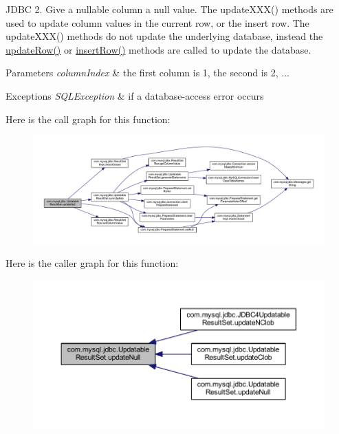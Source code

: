 J\+D\+BC 2. Give a nullable column a null value. The update\+X\+X\+X() methods are used to update column values in the current row, or the insert row. The update\+X\+X\+X() methods do not update the underlying database, instead the \mbox{\hyperlink{classcom_1_1mysql_1_1jdbc_1_1_updatable_result_set_a919969ba4b3c7cbc7b18605e9f31a746}{update\+Row()}} or \mbox{\hyperlink{classcom_1_1mysql_1_1jdbc_1_1_updatable_result_set_aef041f8d9d0778083716fc26652648fa}{insert\+Row()}} methods are called to update the database.


\begin{DoxyParams}{Parameters}
{\em column\+Index} & the first column is 1, the second is 2, ...\\
\hline
\end{DoxyParams}

\begin{DoxyExceptions}{Exceptions}
{\em S\+Q\+L\+Exception} & if a database-\/access error occurs \\
\hline
\end{DoxyExceptions}
Here is the call graph for this function\+:
\nopagebreak
\begin{figure}[H]
\begin{center}
\leavevmode
\includegraphics[width=350pt]{classcom_1_1mysql_1_1jdbc_1_1_updatable_result_set_a37fe836a746ef0fbbf56ca12092abedf_cgraph}
\end{center}
\end{figure}
Here is the caller graph for this function\+:
\nopagebreak
\begin{figure}[H]
\begin{center}
\leavevmode
\includegraphics[width=350pt]{classcom_1_1mysql_1_1jdbc_1_1_updatable_result_set_a37fe836a746ef0fbbf56ca12092abedf_icgraph}
\end{center}
\end{figure}
